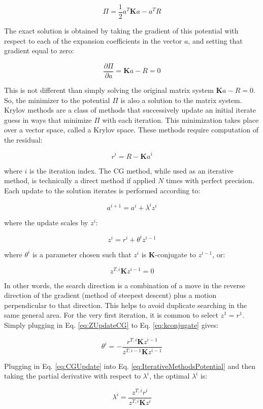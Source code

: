 \documentclass[10pt]{article}
\newcommand{\beq}{\begin{equation}}
\newcommand{\eeq}{\end{equation}}
\begin{document}
\beq
\label{eq:IterativeMethodsPotential}
\Pi=\frac{1}{2}a^T\textbf{K}a-a^TR
\eeq

The exact solution is obtained by taking the gradient of this potential with respect to each of the expansion coefficients in the vector \(a\), and setting that gradient equal to zero:

\beq
\frac{\partial\Pi}{\partial a}=\textbf{K}a-R=0
\eeq

This is not different than simply solving the original matrix system \(\textbf{K}a-R=0\). So, the minimizer to the potential \(\Pi\) is also a solution to the matrix system. Krylov methods are a class of methods that successively update an initial iterate guess in ways that minimize \(\Pi\) with each iteration. This minimization takes place over a vector space, called a Krylov space. These methods require computation of the residual:

\beq
r^i=R-\textbf{K}a^i
\eeq

where \(i\) is the iteration index. The CG method, while used as an iterative method, is technically a direct method if applied \(N\) times with perfect precision. Each update to the solution iterates is performed according to:

\beq
\label{eq:CGUpdate}
a^{i+1}=a^i+\lambda^iz^i
\eeq

where the update scales by \(z^i\):

\beq
\label{eq:ZUpdateCG}
z^i=r^i+\theta^iz^{i-1}
\eeq

where \(\theta^i\) is a parameter chosen such that \(z^i\) is \(\textbf{K}\)-conjugate to \(z^{i-1}\), or:

\beq
\label{eq:kconjugate}
z^{T,i}\textbf{K}z^{i-1}=0
\eeq

In other words, the search direction is a combination of a move in the reverse direction of the gradient (method of steepest descent) plus a motion perpendicular to that direction. This helps to avoid duplicate searching in the same general area. For the very first iteration, it is common to select \(z^1=r^1\). Simply plugging in Eq. \eqref{eq:ZUpdateCG} to Eq. \eqref{eq:kconjugate} gives:

\beq
\theta^i=-\frac{r^{T,i}\textbf{K}z^{i-1}}{z^{T,i-1}\textbf{K}z^{i-1}}
\eeq

Plugging in Eq. \eqref{eq:CGUpdate} into Eq. \eqref{eq:IterativeMethodsPotential} and then taking the partial derivative with respect to \(\lambda^i\), the optimal \(\lambda^i\) is:

\beq
\label{eq:UpdateCG}
\lambda^i=\frac{z^{T,i}r^i}{z^{T,i}\textbf{K}z^i}
\eeq
\end{document}
